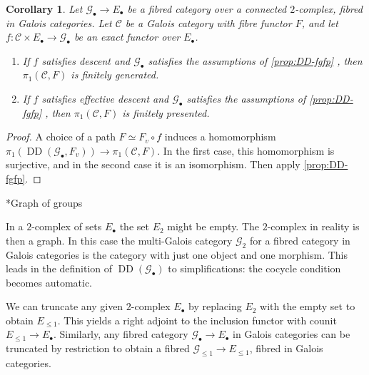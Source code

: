 \documentclass[a4paper,twoside,11pt,reqno]{amsart}
\makeatletter
\newcommand{\cC}{{\mathcal C}}
\newcommand{\cG}{{\mathcal G}}
\DeclareMathOperator{\Desc}{DD}
\def\subsubsection{\@startsection{subsubsection}{3}%
      \z@{.5\linespacing\@plus.7\linespacing}{-.5em}%
      {\normalfont\bfseries}}
\newtheorem{cor}[thm]{Corollary}
\theoremstyle{definition}
\numberwithin{equation}{subsection}
\makeatother
\begin{document}
\begin{cor}
\label{cor:DD-fgfp}
       Let $\cG_\bullet \to E_\bullet$ be a fibred category over a connected $2$-complex, fibred in Galois categories. Let $\cC$ be a Galois category with fibre functor $F$, and let $f\colon  \cC \times E_\bullet \to \cG_\bullet$  be an exact functor over $E_\bullet$.  
       \begin{enumerate}[ref=(\arabic*)]
           \item 
            \label{coritem:DD-fg}
           If $f$ satisfies descent and $\cG_\bullet$ satisfies the assumptions of \cref{prop:DD-fgfp} , then $\pi_1(\cC,F)$ is finitely generated.
           \item 
            \label{coritem:DD-fp}
           If $f$ satisfies effective descent and $\cG_\bullet$ satisfies the assumptions of \cref{prop:DD-fgfp} , then $\pi_1(\cC,F)$ is finitely presented.
       \end{enumerate}
\end{cor}
\begin{proof}
    A choice of a path $F \simeq F_v \circ f$ induces a homomorphism $\pi_1(\Desc(\cG_\bullet,F_v)) \to \pi_1(\cC,F)$. In the first case, this homomorphism is surjective, and in the second case it is an isomorphism. Then apply \cref{prop:DD-fgfp}.
\end{proof}


\subsubsection*{Graph of groups} 

In a $2$-complex of sets $E_\bullet$ the set $E_2$ might be empty. The $2$-complex in reality is then a graph. In this case the multi-Galois category $\cG_2$ for a fibred category in Galois categories is the category with just one object and one morphism. This leads in the definition of $\Desc(\cG_\bullet)$ to simplifications: the cocycle condition becomes automatic. 

We can truncate any given $2$-complex $E_\bullet$ by replacing $E_2$ with the empty set to obtain $E_{\le 1}$. This yields a right adjoint to the inclusion functor with counit $E_{\leq 1} \to E_\bullet$. Similarly, any fibred category $\cG_\bullet \to E_\bullet$ in Galois categories can be truncated by restriction to obtain a fibred $\cG_{\leq 1} \to E_{\leq 1}$, fibred in Galois categories. 
\end{document}
